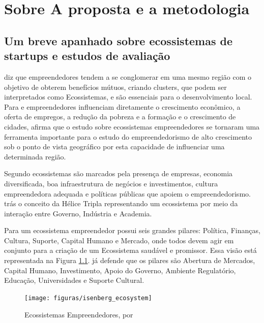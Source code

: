 \chapter[Sobre a proposta e a metodologia]{Sobre A proposta e a metodologia}
\label{cap-sobre-a-proposta-e-a-metodologia}

\section{Um breve apanhado sobre ecossistemas de startups e estudos de avaliação}
\label{section:um_breve_apanhado_sobre_ecossistemas_de_startups_e_estudos_de_avaliação}

 diz que empreendedores tendem a se conglomerar em uma mesmo região com o objetivo de obterem benefícios mútuos, criando clusters, que podem ser interpretados como Ecossistemas, e são essenciais para o desenvolvimento local. Para  e  empreendedores influenciam diretamente o crescimento econômico, a oferta de empregos, a redução da pobreza e a formação e o crescimento de cidades,  afirma que o estudo sobre ecossistemas empreendedores se tornaram uma ferramenta importante para o estudo do empreendedorismo de alto crescimento sob o ponto de vista geográfico por esta capacidade de influenciar uma determinada região.

Segundo  ecossistemas são marcados pela presença de empresas, economia diversificada, boa infraestrutura de negócios e investimentos, cultura empreendedora adequada e políticas públicas que apoiem o empreendedorismo.  trás o conceito da Hélice Tripla representando um ecossistema por meio da interação entre Governo, Indústria e Academia.

Para  um ecossistema empreendedor possui seis grandes pilares: Política, Finanças, Cultura, Suporte, Capital Humano e Mercado, onde todos devem agir em conjunto para a criação de um Ecossistema saudável e promissor. Essa visão está representada na Figura \ref{figure:isenberg_ecosystem}.  já defende que os pilares são Abertura de Mercados, Capital Humano, Investimento, Apoio do Governo, Ambiente Regulatório, Educação, Universidades e Suporte Cultural.

\begin{figure}[!htb]
\centering
\texttt{[image: figuras/isenberg\_ecosystem]}
\caption{Ecossistemas Empreendedores, por }
\label{figure:isenberg_ecosystem}
\end{figure}

